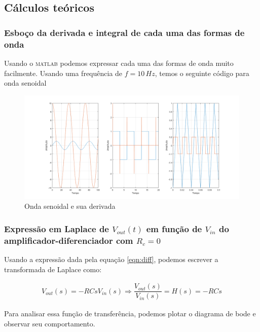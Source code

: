 \subsection{Cálculos teóricos}
\subsubsection{Esboço da derivada e integral de cada uma das formas de onda}

Usando o \textsc{matlab} podemos expressar cada uma das formas de onda muito facilmente. Usando uma frequência de $f=10 \,Hz$, temos o seguinte código para onda senoidal





\begin{figure}[H]
    \centering
    \includegraphics[width=1\textwidth]{imagens/plot_waves.png}
    \caption{Onda senoidal e sua derivada}
    \label{fig:onda_sin}
\end{figure}


\subsubsection{Expressão em Laplace de $V_{out}(t)$ em função de $V_{in}$ do amplificador-diferenciador com $R_c=0$} 

Usando a expressão dada pela equação \ref{eqn:diff}, podemos escrever a transformada de Laplace como:


\begin{gather*}
	V_{out}(s) = -RC sV_{in}(s)
	\Longrightarrow \dfrac{V_{out}(s)}{V_{in}(s)} = H(s) = -RCs
\end{gather*}

Para analisar essa função de transferência, podemos plotar o diagrama de bode e observar seu comportamento.

